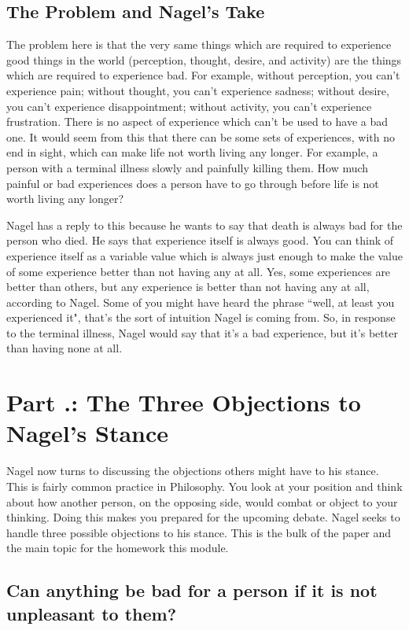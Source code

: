 \subsection{The Problem and Nagel's Take}
The problem here is that the very same things which are required to experience good things in the world (perception, thought, desire, and activity) are the things which are required to experience bad. For example, without perception, you can't experience pain; without thought, you can't experience sadness; without desire, you can't experience disappointment; without activity, you can't experience frustration. There is no aspect of experience which can't be used to have a bad one. It would seem from this that there can be some sets of experiences, with no end in sight, which can make life not worth living any longer. For example, a person with a terminal illness slowly and painfully killing them. How much painful or bad experiences does a person have to go through before life is not worth living any longer?

Nagel has a reply to this because he wants to say that death is always bad for the person who died. He says that experience itself is always good. You can think of experience itself as a variable value which is always just enough to make the value of some experience better than not having any at all. Yes, some experiences are better than others, but any experience is better than not having any at all, according to Nagel. Some of you might have heard the phrase ``well, at least you experienced it", that's the sort of intuition Nagel is coming from. So, in response to the terminal illness, Nagel would say that it's a bad experience, but it's better than having none at all.  

\section{Part \thechapcount.\theseccount:  The Three Objections to Nagel's Stance}
Nagel now turns to discussing the objections others might have to his stance. This is fairly common practice in Philosophy. You look at your position and think about how another person, on the opposing side, would combat or object to your thinking. Doing this makes you prepared for the upcoming debate. Nagel seeks to handle three possible objections to his stance. This is the bulk of the paper and the main topic for the homework this module.

\subsection{Can anything be bad for a person if it is not unpleasant to them?}

